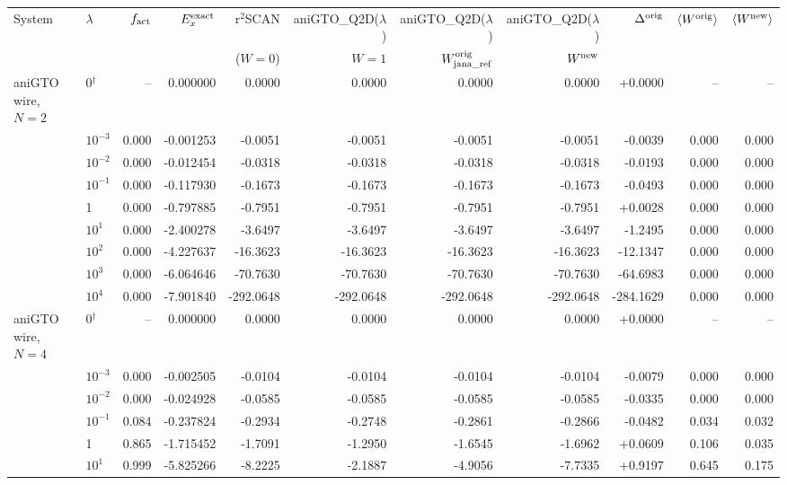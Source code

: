 \begin{tabular}{@{}llr rrrrrr rr@{}}
\toprule
System & $\lambda$ & $f_{\rm act}$ & $E_x^{\rm exact}$ & r$^2$SCAN & aniGTO\_Q2D($\lambda$) & aniGTO\_Q2D($\lambda$) & aniGTO\_Q2D($\lambda$) & $\Delta^{\rm orig}$ & $\langle W^{\rm orig}\rangle$ & $\langle W^{\rm new}\rangle$ \\
 & & & & ($W=0$) & $W=1$ & $W^{\rm orig}_{\rm jana\_ref}$ & $W^{\rm new}$ & & & \\
\midrule
aniGTO wire, $N=2$ & 0$^{\dagger}$ & -- & 0.000000 & 0.0000 & 0.0000 & 0.0000 & 0.0000 & +0.0000 & -- & -- \\
 & $10^{-3}$ & 0.000 & -0.001253 & -0.0051 & -0.0051 & -0.0051 & -0.0051 & -0.0039 & 0.000 & 0.000 \\
 & $10^{-2}$ & 0.000 & -0.012454 & -0.0318 & -0.0318 & -0.0318 & -0.0318 & -0.0193 & 0.000 & 0.000 \\
 & $10^{-1}$ & 0.000 & -0.117930 & -0.1673 & -0.1673 & -0.1673 & -0.1673 & -0.0493 & 0.000 & 0.000 \\
 & 1 & 0.000 & -0.797885 & -0.7951 & -0.7951 & -0.7951 & -0.7951 & +0.0028 & 0.000 & 0.000 \\
 & $10^{1}$ & 0.000 & -2.400278 & -3.6497 & -3.6497 & -3.6497 & -3.6497 & -1.2495 & 0.000 & 0.000 \\
 & $10^{2}$ & 0.000 & -4.227637 & -16.3623 & -16.3623 & -16.3623 & -16.3623 & -12.1347 & 0.000 & 0.000 \\
 & $10^{3}$ & 0.000 & -6.064646 & -70.7630 & -70.7630 & -70.7630 & -70.7630 & -64.6983 & 0.000 & 0.000 \\
 & $10^{4}$ & 0.000 & -7.901840 & -292.0648 & -292.0648 & -292.0648 & -292.0648 & -284.1629 & 0.000 & 0.000 \\
\addlinespace
aniGTO wire, $N=4$ & 0$^{\dagger}$ & -- & 0.000000 & 0.0000 & 0.0000 & 0.0000 & 0.0000 & +0.0000 & -- & -- \\
 & $10^{-3}$ & 0.000 & -0.002505 & -0.0104 & -0.0104 & -0.0104 & -0.0104 & -0.0079 & 0.000 & 0.000 \\
 & $10^{-2}$ & 0.000 & -0.024928 & -0.0585 & -0.0585 & -0.0585 & -0.0585 & -0.0335 & 0.000 & 0.000 \\
 & $10^{-1}$ & 0.084 & -0.237824 & -0.2934 & -0.2748 & -0.2861 & -0.2866 & -0.0482 & 0.034 & 0.032 \\
 & 1 & 0.865 & -1.715452 & -1.7091 & -1.2950 & -1.6545 & -1.6962 & +0.0609 & 0.106 & 0.035 \\
 & $10^{1}$ & 0.999 & -5.825266 & -8.2225 & -2.1887 & -4.9056 & -7.7335 & +0.9197 & 0.645 & 0.175 \\

\end{tabular}
